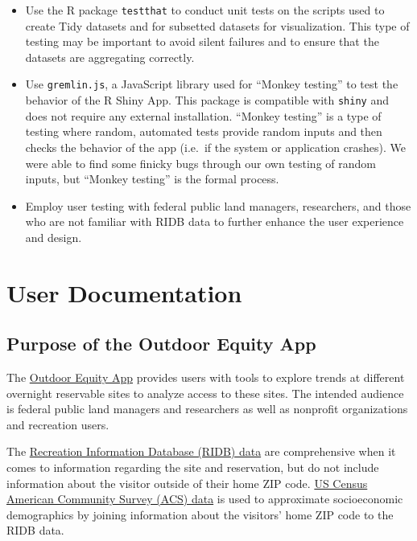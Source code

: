 \documentclass[
]{book}
\providecommand{\tightlist}{%
  \setlength{\itemsep}{0pt}\setlength{\parskip}{0pt}}
\begin{document}
\begin{itemize}
\tightlist
\item
  Use the R package \texttt{testthat} \citep{R-testthat} to conduct unit tests on the scripts used to create Tidy datasets and for subsetted datasets for visualization. This type of testing may be important to avoid silent failures and to ensure that the datasets are aggregating correctly.
\item
  Use \texttt{gremlin.js}, a JavaScript library used for ``Monkey testing'' to test the behavior of the R Shiny App. This package is compatible with \texttt{shiny} \citep{R-shiny} and does not require any external installation. ``Monkey testing'' is a type of testing where random, automated tests provide random inputs and then checks the behavior of the app (i.e.~if the system or application crashes). We were able to find some finicky bugs through our own testing of random inputs, but ``Monkey testing'' is the formal process.
\item
  Employ user testing with federal public land managers, researchers, and those who are not familiar with RIDB data to further enhance the user experience and design.
\end{itemize}

\hypertarget{user-documentation}{%
\chapter{User Documentation}\label{user-documentation}}

\hypertarget{purpose-of-the-outdoor-equity-app}{%
\section{Purpose of the Outdoor Equity App}\label{purpose-of-the-outdoor-equity-app}}

The \href{https://shinyapps.bren.ucsb.edu/oe_app/}{Outdoor Equity App} provides users with tools to explore trends at different overnight reservable sites to analyze access to these sites. The intended audience is federal public land managers and researchers as well as nonprofit organizations and recreation users.

The \href{https://ridb.recreation.gov/landing}{Recreation Information Database (RIDB) data} are comprehensive when it comes to information regarding the site and reservation, but do not include information about the visitor outside of their home ZIP code. \href{https://www.census.gov/programs-surveys/acs/data.html}{US Census American Community Survey (ACS) data} is used to approximate socioeconomic demographics by joining information about the visitors' home ZIP code to the RIDB data.
\end{document}
